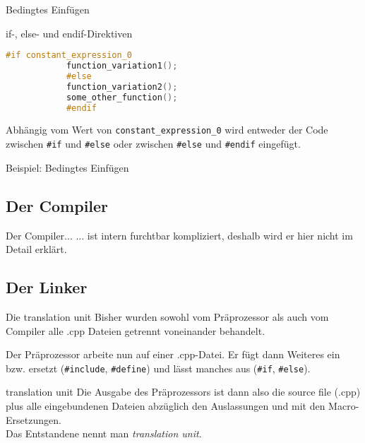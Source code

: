 \begin{frame}[fragile]{Bedingtes Einfügen}
	\begin{block}{if-, else- und endif-Direktiven}
		\begin{lstlisting}[language=C++]
			#if constant_expression_0
			function_variation1();
			#else
			function_variation2();
			some_other_function();
			#endif
		\end{lstlisting}
		Abhängig vom Wert von \verb|constant_expression_0| wird entweder der Code zwischen \verb|#if| und \verb|#else| oder zwischen \verb|#else| und \verb|#endif| eingefügt.
	\end{block}
\end{frame}

\begin{frame}[t]{Beispiel: Bedingtes Einfügen}
	\footnotesize
	\only<1>{
		
	}
	\only<2>{
		
	}
	\only<3>{
		
	}
\end{frame}


\subsection{Der Compiler}
\begin{frame}[fragile]{Der Compiler...}
	... ist intern furchtbar kompliziert, deshalb wird er hier nicht im Detail erklärt.
\end{frame}


\subsection{Der Linker}

\begin{frame}[fragile]{Die translation unit}
	Bisher wurden sowohl vom Präprozessor als auch vom Compiler alle .cpp Dateien getrennt voneinander behandelt.
	
	Der Präprozessor arbeite nun auf einer .cpp-Datei. Er fügt dann Weiteres ein bzw. ersetzt (\verb|#include|, \verb|#define|) und lässt manches aus (\verb|#if|, \verb|#else|).
	
	\vspace{1em}
	
	\begin{block}{translation unit}
		Die Ausgabe des Präprozessors ist dann also die source file (.cpp) plus alle eingebundenen Dateien abzüglich den Auslassungen und mit den Macro-Ersetzungen.\\
		Das Entstandene nennt man \emph{translation unit}.
	\end{block}
\end{frame}

